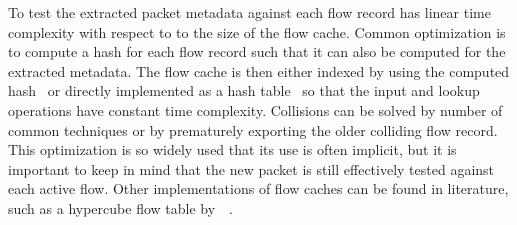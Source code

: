 To test the extracted packet metadata against each flow record has linear time complexity with respect to to the size of the flow cache. Common optimization is to compute a hash for each flow record such that it can also be computed for the extracted metadata. The flow cache is then either indexed by using the computed hash~\cite{Molina-2006-Design} or directly implemented as a hash table~\cite{Estan-2004-Building} so that the input and lookup operations have constant time complexity. Collisions can be solved by number of common techniques or by prematurely exporting the older colliding flow record. This optimization is so widely used that its use is often implicit, but it is important to keep in mind that the new packet is still effectively tested against each active flow. Other implementations of flow caches can be found in literature, such as a hypercube flow table by~\citeauthor{Wang-2011-Memory}~\cite{Wang-2011-Memory}.

